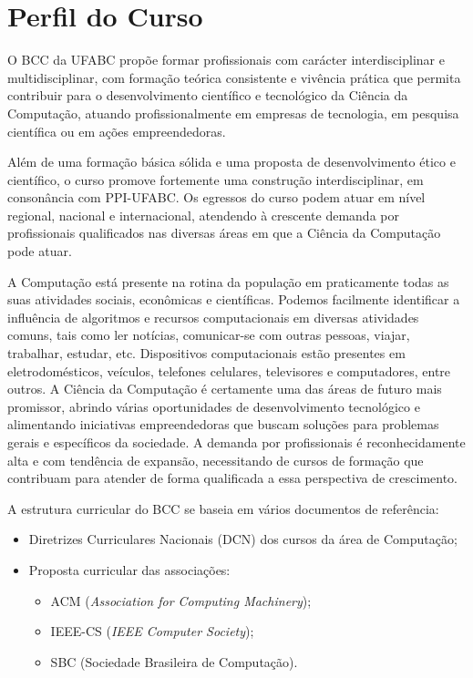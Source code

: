 \section{Perfil do Curso}
\label{sec:perfil_curso}

O BCC da UFABC propõe formar profissionais com carácter interdisciplinar e
multidisciplinar, com formação teórica consistente e vivência prática que
permita contribuir para o desenvolvimento científico e tecnológico da Ciência
da Computação, atuando profissionalmente em empresas de tecnologia, em pesquisa
científica ou em ações empreendedoras.

Além de uma formação básica sólida e uma proposta de desenvolvimento ético e
científico, o curso promove fortemente uma construção interdisciplinar, em
consonância com PPI-UFABC.
Os egressos do curso podem atuar em nível regional, nacional e internacional,
atendendo à crescente demanda por profissionais qualificados nas diversas áreas
em que a Ciência da Computação pode atuar.

A Computação está presente na rotina da população em praticamente todas as suas
atividades sociais, econômicas e científicas.
Podemos facilmente identificar a influência de algoritmos e recursos
computacionais em diversas atividades comuns, tais como ler notícias,
comunicar-se com outras pessoas, viajar, trabalhar, estudar, etc.
Dispositivos computacionais estão presentes em eletrodomésticos, veículos,
telefones celulares, televisores e computadores, entre outros.
A Ciência da Computação é certamente uma das áreas de futuro mais promissor,
abrindo várias oportunidades de desenvolvimento tecnológico e alimentando
iniciativas empreendedoras que buscam soluções para problemas gerais e
específicos da sociedade.
A demanda por profissionais é reconhecidamente alta e com tendência de
expansão, necessitando de cursos de formação que contribuam para atender de
forma qualificada a essa perspectiva de crescimento.

A estrutura curricular do BCC se baseia em vários documentos de referência:
\begin{itemize}
    \item Diretrizes Curriculares Nacionais (DCN) dos cursos da área de
    Computação;
    \item Proposta curricular das associações:
    \begin{itemize}
        \item ACM (\textit{Association for Computing Machinery});
        \item IEEE-CS (\textit{IEEE Computer Society});
        \item SBC (Sociedade Brasileira de Computação).
    \end{itemize}
\end{itemize}

